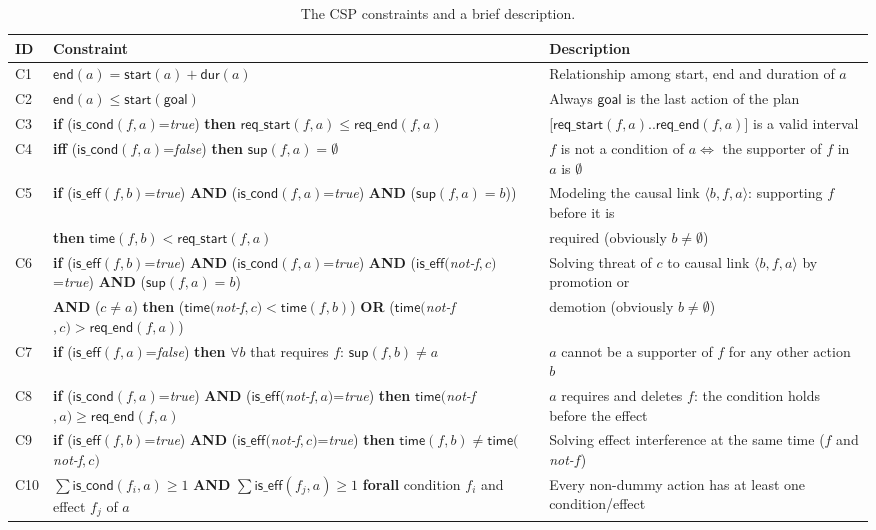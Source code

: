\documentclass{ecai}
\newcommand{\tup}[1]{{\langle #1 \rangle}}
\newcommand{\dur}{\mathsf{dur}}    %
\newcommand{\iscond}{\mathsf{is\_cond}}    %
\newcommand{\iseff}{\mathsf{is\_eff}}    %
\newcommand{\start}{\mathsf{start}}%
\newcommand{\en}{\mathsf{end}}     %
\newcommand{\supp}{\mathsf{sup}}   %
\newcommand{\tim}{\mathsf{time}}   %
\newcommand{\reqs}{\mathsf{req\_{start}}} %
\newcommand{\reqe}{\mathsf{req\_{end}}}   %
\newcommand{\goal}{\mathsf{goal}}  %
\begin{document}
\begin{table*}
\begin{center}
\caption{The CSP constraints and a brief description.}	
\begin{scriptsize}
\begin{tabular}{lp{10.4cm}p{6.6cm}}
\hline
{\bf ID}&{\bf Constraint}&{\bf Description}\\\hline
C1& $\en(a)=\start(a)+\dur(a)$ & Relationship among start, end and duration of $a$ \\
C2& $\en(a) \leq \start(\goal)$ & Always $\goal$ is the last action of the plan \\
C3& \textbf{if} ($\iscond(f,a)$=\textit{true}) \textbf{then} $\reqs(f,a) \leq \reqe(f,a)$ & [$\reqs(f,a)..\reqe(f,a)$] is a valid interval\\
C4& \textbf{iff} ($\iscond(f,a)$=\textit{false}) \textbf{then} $\supp(f,a) = \emptyset$ & $f$ is not a condition of $a \iff $ the supporter of $f$ in $a$ is $\emptyset$ \\
C5& \textbf{if} ($\iseff(f,b)$=\textit{true}) \textbf{AND} ($\iscond(f,a)$=\textit{true}) \textbf{AND} ($\supp(f,a)=b$))  & Modeling the causal link $\tup{b,f,a}$: supporting $f$ before it is \\
&\hspace{0.5cm}\textbf{then} $\tim(f,b) < \reqs(f,a)$ & required (obviously $b \neq \emptyset$) \\
C6& \textbf{if} ($\iseff(f,b)$=\textit{true}) \textbf{AND} ($\iscond(f,a)$=\textit{true}) \textbf{AND} ($\iseff($\textit{not-f}$,c)$=\textit{true}) \textbf{AND} ($\supp(f,a)=b$) & Solving threat of $c$ to causal link $\tup{b,f,a}$ by promotion or \\
&\hspace{0.5cm}\textbf{AND} ($c \neq a$) \textbf{then} ($\tim($\textit{not-f}$,c) < \tim(f,b)$) \textbf{OR} ($\tim($\textit{not-f}$,c) > \reqe(f,a)$) & demotion (obviously $b \neq \emptyset$) \\
C7& \textbf{if} ($\iseff(f,a)$=\textit{false}) \textbf{then} $\forall b$ that requires $f$: $\supp(f,b) \neq a$ & $a$ cannot be a supporter of $f$ for any other action $b$\\
C8& \textbf{if} ($\iscond(f,a)$=\textit{true}) \textbf{AND} ($\iseff($\textit{not-f}$,a)$=\textit{true}) \textbf{then} $\tim($\textit{not-f}$,a) \geq \reqe(f,a)$ & $a$ requires and deletes $f$: the condition holds before the effect \\ 
C9& \textbf{if} ($\iseff(f,b)$=\textit{true}) \textbf{AND} ($\iseff($\textit{not-f}$,c)$=\textit{true}) \textbf{then} $\tim(f,b) \neq \tim($\textit{not-f}$,c)$ & Solving effect interference at the same time ($f$ and \textit{not-}$f$) \\
C10& $\sum \iscond(f_i,a) \geq 1$ \textbf{AND} $\sum \iseff(f_j,a) \geq 1$ \textbf{forall} condition $f_i$ and effect $f_j$ of $a$ & Every non-dummy action has at least one condition/effect
\end{tabular}
\end{scriptsize}	
\label{table:constraints}
\end{center}	
\end{table*}
\end{document}
